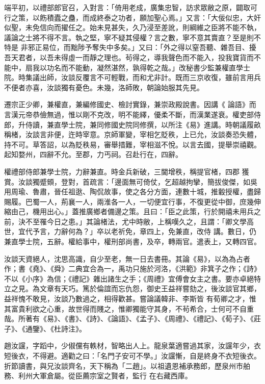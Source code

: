 \begin{pinyinscope}
 端平初，以禮部郎官召，入對言：「倚用老成，廣集忠智，訪求眾敝之原，闢取可行之策，以飭積蠹之蠱，而成終泰之功者，願加聖心焉。」又言：「大佞似忠，大奸似聖，未免信向而擢任之。始未見甚失，久乃浸至差訛，則綱維之臣將不能不執，議論之士將不得不言。執之堅，寧不疑其侵權？言之數，寧不意其賣直？至是則不特是
 非邪正易位，而黜陟予奪失中多矣。」又曰：「外之得以窒吾聽、雜吾目、擾吾天君者，以吾未得虛一而靜之理也。茍得之，導我聲色而不能入，投我寶貨而不能中，扇我以功名而不能動，凝然湛然，孰得乾之哉。」改秘書少監兼權直學士院。時集議出師，汝談反覆言不可輕戰，而和尤非計。既而三京收復，雖前言用兵不便者亦喜，汝談獨有憂色。未幾，洛師敗，朝論始服其先見。



 遷宗正少卿，兼權直，兼編修國史、檢討實錄，兼崇政殿說書。因講《
 論語》而言漢元帝恭儉無過，惟以剛不克改，明不能繹，優柔不斷，而漢業遂衰。權吏部侍郎，升侍讀，兼直學士院，兼同修國史院同修撰，以所注《易》進講。時朝議履畝稱楮，汝談言非便，迕時宰意。京師軍變，宰相乞貶秩，上已允，汝談奏恐失體，持不可。草答詔，以為貶秩易，審舉措難，宰相滋不悅。以言去國，提舉崇禧觀。起知婺州，四辭不允。至郡，力丐祠。召赴行在，四辭。



 權禮部侍郎兼學士院，力辭兼直。時金兵新破，三閫增秩，稱提官楮，四郡
 獲賞。汝談獨蹙頞，登對，首疏言：「邊面無可倚仗，乞超越拘攣，簡拔俊傑，如吳用周瑜、魯肅，晉任祖逖、陶侃故事，使之各分方面，連數十城，推轂授權，盡歸賜履。巴蜀一人，荊襄一人，兩淮各一人，一切便宜行事，不復更從中御，庶幾伸縮由己，機用出心。」蓋推廣鄉者備邊之策。且曰：「臣之此策，行於開禧未用兵之前，決不至罹今日之患。」其論楮法，尤中時敝，上稱嘆久之，且謂：「卿文學高世，宜代予言，力辭何為？」卒以老祈免，章四上，免兼直，改侍
 講。數日，仍兼直學士院，五辭。權給事中，權刑部尚書，及卒，轉兩官。遣表上，又轉四官。



 汝談天資絕人，沈思高識，自少至老，無一日去書冊。其論《易》，以為為占者作；書《堯》、《舜》二典宜合為一，禹功只施於河洛，《洪範》非箕子之作；《詩》不以《小序》為信；《禮記》雜出諸生之手；《周禮》宜傅會女主之書。要亦卓絕特立之見。為文章有天巧。篤於倫誼而忘仇怨，御史王益祥嘗劾之，後汝談官其鄉，益祥愧不敢見，汝談乃數過之，相得歡甚。嘗論議韓非、李斯皆
 有荀卿之才，惟其富貴利欲之心重，故世得而賤之，惟卿獨能守其身，不茍希合，士何可不自重哉。所著有《易》、《書》、《詩》、《論語》、《孟子》、《周禮》、《禮記》、《荀子》、《莊子》、《通鑒》、《杜詩注》。



 趙汝讜，字蹈中，少俶儻有軼材，智略出人上。龍泉葉適嘗過其家，汝讜年少，衣短後衣，不得避。適勸之曰：「名門子安可不學。」汝讜慚，自是終身不衣短後衣。折節讀書，與兄汝談齊名，天下稱為「二趙」。以祖遺恩補承務郎，歷泉州市舶務、利州大軍倉屬。從臣薦宗室之賢者，監行
 在右藏西庫。




\end{pinyinscope}
